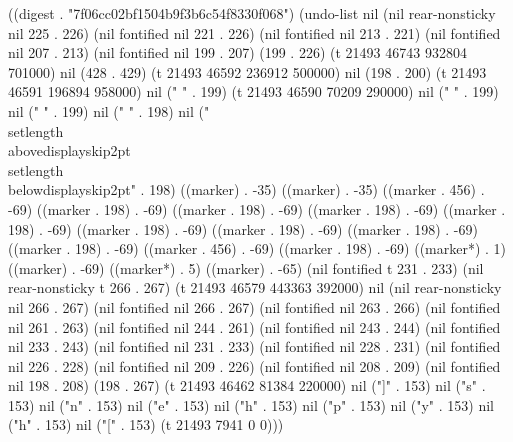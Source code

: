 
((digest . "7f06cc02bf1504b9f3b6c54f8330f068") (undo-list nil (nil rear-nonsticky nil 225 . 226) (nil fontified nil 221 . 226) (nil fontified nil 213 . 221) (nil fontified nil 207 . 213) (nil fontified nil 199 . 207) (199 . 226) (t 21493 46743 932804 701000) nil (428 . 429) (t 21493 46592 236912 500000) nil (198 . 200) (t 21493 46591 196894 958000) nil ("
" . 199) (t 21493 46590 70209 290000) nil ("
" . 199) nil ("%
" . 199) nil ("%
" . 198) nil ("\\setlength{\\abovedisplayskip}{2pt}
\\setlength{\\belowdisplayskip}{2pt}" . 198) ((marker) . -35) ((marker) . -35) ((marker . 456) . -69) ((marker . 198) . -69) ((marker . 198) . -69) ((marker . 198) . -69) ((marker . 198) . -69) ((marker . 198) . -69) ((marker . 198) . -69) ((marker . 198) . -69) ((marker . 198) . -69) ((marker . 456) . -69) ((marker . 198) . -69) ((marker*) . 1) ((marker) . -69) ((marker*) . 5) ((marker) . -65) (nil fontified t 231 . 233) (nil rear-nonsticky t 266 . 267) (t 21493 46579 443363 392000) nil (nil rear-nonsticky nil 266 . 267) (nil fontified nil 266 . 267) (nil fontified nil 263 . 266) (nil fontified nil 261 . 263) (nil fontified nil 244 . 261) (nil fontified nil 243 . 244) (nil fontified nil 233 . 243) (nil fontified nil 231 . 233) (nil fontified nil 228 . 231) (nil fontified nil 226 . 228) (nil fontified nil 209 . 226) (nil fontified nil 208 . 209) (nil fontified nil 198 . 208) (198 . 267) (t 21493 46462 81384 220000) nil ("]" . 153) nil ("s" . 153) nil ("n" . 153) nil ("e" . 153) nil ("h" . 153) nil ("p" . 153) nil ("y" . 153) nil ("h" . 153) nil ("[" . 153) (t 21493 7941 0 0)))
